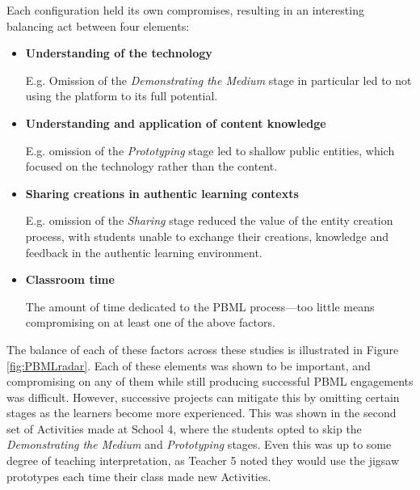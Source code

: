 Each configuration held its own compromises, resulting in an interesting balancing act between four elements: 

\begin{itemize}
  \item \textbf{Understanding of the technology}
  
  E.g. Omission of the \textit{Demonstrating the Medium} stage in particular led to not using the platform to its full potential.
  
  \item \textbf{Understanding and application of content knowledge}

  E.g. omission of the \textit{Prototyping} stage led to shallow public entities, which focused on the technology rather than the content.
  
  \item \textbf{Sharing creations in authentic learning contexts}
  
  E.g. omission of the \textit{Sharing} stage reduced the value of the entity creation process, with students unable to exchange their creations, knowledge and feedback in the authentic learning environment.
  
  \item \textbf{Classroom time}
  
  The amount of time dedicated to the PBML process---too little means compromising on at least one of the above factors.
  
\end{itemize}

The balance of each of these factors across these studies is illustrated in Figure \ref{fig:PBMLradar}. Each of these elements was shown to be important, and compromising on any of them while still producing successful PBML engagements was difficult. However, successive projects can mitigate this by omitting certain stages as the learners become more experienced. This was shown in the second set of Activities made at School 4, where the students opted to skip the \textit{Demonstrating the Medium} and \textit{Prototyping} stages. Even this was up to some degree of teaching interpretation, as Teacher 5 noted they would use the jigsaw prototypes each time their class made new Activities. 

